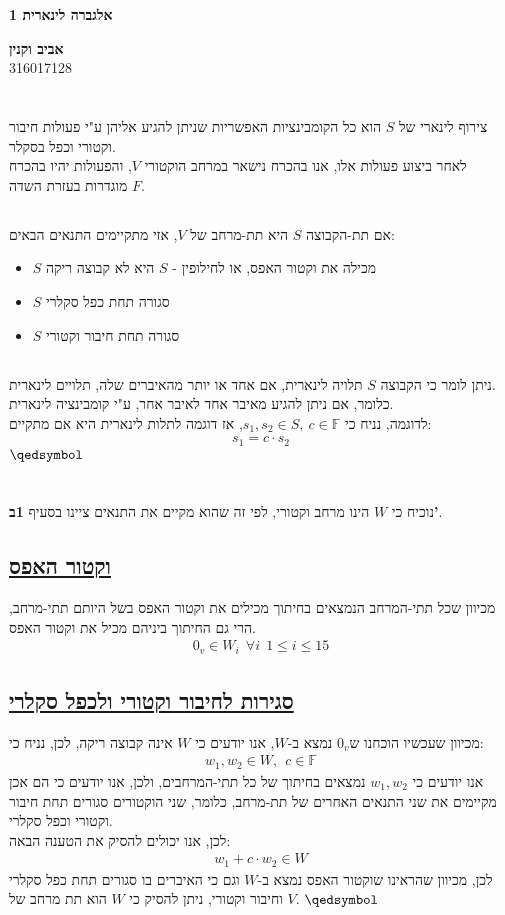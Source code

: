 \documentclass[a4paper, 12pt, leqno]{article}
\newcommand{\sub}[1]{\subsection{\underline{#1}}}
\newcommand{\F}{\ensuremath{\mathbb{F}}}
\newcommand{\eq}[1]{\begin{align*}#1\end{align*}}
\renewcommand{\qed}{\hfill\(\qedsymbol\)}
\renewcommand{\leq}{\leqslant}
\begin{document}
\begin{titlepage}
    \begin{center}
        \vspace*{4cm}
        {\fontsize{35pt}{35pt}\selectfont \textbf{אלגברה לינארית 1}}
        \vspace{0.4cm}

        {}
        \vfill

        {\Large\textbf{אביב וקנין}\\
        316017128}
    \end{center}
\end{titlepage}

\section{}
\sub{}
צירוף לינארי של $S$ הוא כל הקומבינציות האפשריות שניתן להגיע אליהן ע"י פעולות חיבור וקטורי וכפל בסקלר.\\
לאחר ביצוע פעולות אלו, אנו בהכרח נישאר במרחב הוקטורי $V$, והפעולות יהיו בהכרח מוגדרות בעזרת השדה $F$.
\sub{}
אם תת-הקבוצה $S$ היא תת-מרחב של $V$, אזי מתקיימים התנאים הבאים:
\begin{itemize}
    \item $S$ מכילה את וקטור האפס, או לחילופין - $S$ היא לא קבוצה ריקה
    \item $S$ סגורה תחת כפל סקלרי
    \item $S$ סגורה תחת חיבור וקטורי
\end{itemize}
\sub{}
ניתן לומר כי הקבוצה $S$ תלויה לינארית, אם אחד או יותר מהאיברים שלה, תלויים לינארית.\\ כלומר, אם ניתן להגיע מאיבר אחד לאיבר אחר, ע"י קומבינציה לינארית.\\
לדוגמה, נניח כי $s_1,s_2\in{S},~c\in\F$, אז דוגמה לתלות לינארית היא אם מתקיים:
\eq{
    s_1=c\cdot{s_2}
}
\qed\pagebreak

\section{}
נוכיח כי $W$ הינו מרחב וקטורי, לפי זה שהוא מקיים את התנאים ציינו בסעיף \textbf{1ב'}.
\sub{וקטור האפס}
מכיוון שכל תתי-המרחב הנמצאים בחיתוך מכילים את וקטור האפס בשל היותם תתי-מרחב, הרי גם החיתוך ביניהם מכיל את וקטור האפס.
\eq{
    0_v\in{W_i}~~\forall{i}~~1\leq{i}\leq15
}
\sub{סגירות לחיבור וקטורי ולכפל סקלרי}
מכיוון שעכשיו הוכחנו ש$0_v$ נמצא ב-$W$, אנו יודעים כי $W$ אינה קבוצה ריקה, לכן, נניח כי:
\eq{
    w_1,w_2\in{W},~~c\in\F
}
אנו יודעים כי $w_1,w_2$ נמצאים בחיתוך של כל תתי-המרחבים, ולכן, אנו יודעים כי הם אכן מקיימים את שני התנאים האחרים של תת-מרחב, כלומר, שני הוקטורים סגורים תחת חיבור וקטורי וכפל סקלרי.\\
לכן, אנו יכולים להסיק את הטענה הבאה:
\eq{
    w_1+c\cdot{w_2}\in{W}
}
לכן, מכיוון שהראינו שוקטור האפס נמצא ב-$W$ וגם כי האיברים בו סגורים תחת כפל סקלרי וחיבור וקטורי, ניתן להסיק כי $W$ הוא תת מרחב של $V$.
\qed\pagebreak
\end{document}
